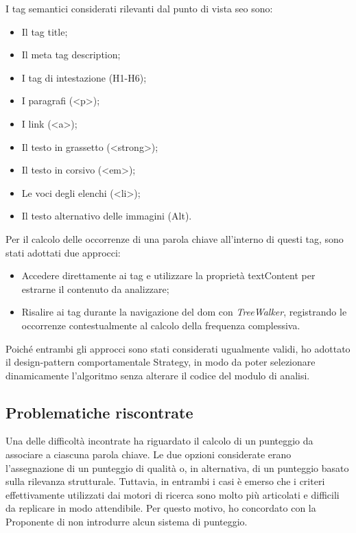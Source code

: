 \vspace{10pt}
\par\noindent I tag semantici considerati rilevanti dal punto di vista \gls{seo} sono:
\begin{itemize}
  \item Il tag title;
  \item Il meta tag description;
  \item I tag di intestazione (H1-H6);
  \item I paragrafi (<p>);
  \item I link (<a>);
  \item Il testo in grassetto (<strong>);
  \item Il testo in corsivo (<em>);
  \item Le voci degli elenchi (<li>);
  \item Il testo alternativo delle immagini (Alt).
\end{itemize}

\vspace{5pt}
\par\noindent Per il calcolo delle occorrenze di una parola chiave all’interno di questi tag, sono stati adottati due approcci:
\begin{itemize}
  \item Accedere direttamente ai tag e utilizzare la proprietà textContent per estrarne il contenuto da analizzare;
  \item Risalire ai tag durante la navigazione del \gls{dom} con \textit{TreeWalker}, registrando le occorrenze contestualmente al calcolo della frequenza complessiva.
\end{itemize}

\vspace{5pt}
\par\noindent Poiché entrambi gli approcci sono stati considerati ugualmente validi, ho adottato il \gls{design-pattern} comportamentale Strategy, in modo da poter selezionare dinamicamente l’algoritmo senza alterare il codice del modulo di analisi.

\subsection{Problematiche riscontrate}

\par Una delle difficoltà incontrate ha riguardato il calcolo di un punteggio da associare a ciascuna parola chiave. Le due opzioni considerate erano l’assegnazione di un punteggio di qualità o, in alternativa, di un punteggio basato sulla rilevanza strutturale. Tuttavia, in entrambi i casi è emerso che i criteri effettivamente utilizzati dai motori di ricerca sono molto più articolati e difficili da replicare in modo attendibile. Per questo motivo, ho concordato con la Proponente di non introdurre alcun sistema di punteggio.

